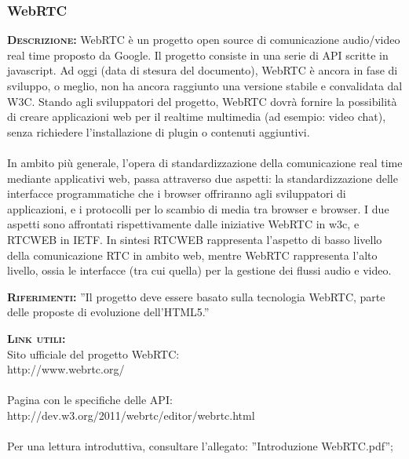 \subsubsection{WebRTC}
\begin{description}
	\item{\scshape\bfseries Descrizione:} WebRTC è un progetto open source di comunicazione audio/video real time proposto da Google. Il progetto consiste in una serie di API scritte in javascript. Ad oggi (data di stesura del documento), WebRTC è ancora in fase di sviluppo, o meglio, non ha ancora raggiunto una versione stabile e convalidata dal W3C. Stando agli sviluppatori del progetto, WebRTC dovrà fornire la possibilità di creare applicazioni web per il realtime multimedia (ad esempio: video chat), senza richiedere l'installazione di plugin o contenuti aggiuntivi.\\\\In ambito più generale, l'opera di standardizzazione della comunicazione real time mediante applicativi web, passa attraverso due aspetti: la standardizzazione delle interfacce programmatiche che i browser offriranno agli sviluppatori di applicazioni, e i protocolli per lo scambio di media tra browser e browser. I due aspetti sono affrontati rispettivamente dalle iniziative WebRTC in w3c, e RTCWEB in IETF. In sintesi RTCWEB rappresenta l'aspetto di basso livello della comunicazione RTC in ambito web, mentre WebRTC rappresenta l'alto livello, ossia le interfacce (tra cui quella) per la gestione dei flussi audio e video.

	\item{\scshape\bfseries Riferimenti:} ''Il progetto deve essere basato sulla tecnologia WebRTC, parte delle proposte di evoluzione dell'HTML5.''
	
	\item{\scshape\bfseries Link utili:}\\Sito ufficiale del progetto WebRTC:\\http://www.webrtc.org/\\\\Pagina con le specifiche delle API:\\http://dev.w3.org/2011/webrtc/editor/webrtc.html\\\\ Per una lettura introduttiva, consultare l'allegato: ''Introduzione WebRTC.pdf'';
\end{description}


